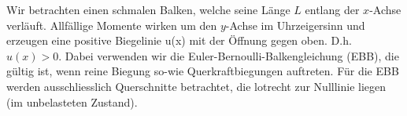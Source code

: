 Wir betrachten einen schmalen Balken, welche seine Länge $L$ entlang der $x$-Achse verläuft.
Allfällige Momente wirken um den $y$-Achse im Uhrzeigersinn und erzeugen eine positive Biegelinie u(x) mit der Öffnung gegen oben.
D.h. $u(x) > 0$.
Dabei verwenden wir die Euler-Bernoulli-Balkengleichung (EBB), die gültig ist, wenn reine Biegung so-wie Querkraftbiegungen auftreten.
Für die EBB werden ausschliesslich Querschnitte betrachtet, die lotrecht zur Nulllinie liegen (im unbelasteten Zustand).